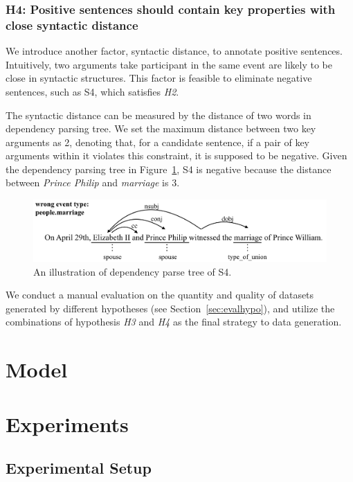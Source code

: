 \documentclass{article}
\begin{document}
\subsubsection{H4: Positive sentences should contain key properties with close syntactic distance}
We introduce another factor, syntactic distance, to annotate positive sentences. Intuitively, two arguments take participant in the same event are likely to be close in syntactic structures. This factor is feasible to eliminate negative sentences, such as S4, which satisfies \emph{H2}. 

The syntactic distance can be measured by the distance of two words in dependency parsing tree. We set the maximum distance between two key arguments as 2, denoting that, for a candidate sentence, if a pair of key arguments within it violates this constraint, it is supposed to be negative. Given the dependency parsing tree in  Figure~\ref{fig:2}, S4 is negative because the distance between \emph{Prince Philip} and \emph{marriage} is 3.

\begin{figure}
	\includegraphics[width=.48\textwidth]{deppath}
	\caption{An illustration of dependency parse tree of S4. \label{fig:2}}
\end{figure}
We conduct a manual evaluation on the quantity and quality of  datasets generated by different hypotheses (see Section~\ref{sec:evalhypo}), and utilize the combinations of hypothesis \emph{H3} and \emph{H4} as the final strategy to data generation.

\section{Model}

\section{Experiments}

\subsection{Experimental Setup}
\end{document}
